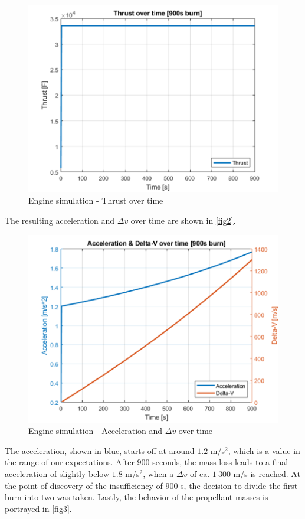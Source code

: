 \begin{figure}[H]
	\centering\includegraphics[width=0.9\linewidth]{thrusttime}
	\caption{Engine simulation - Thrust over time}\label{fig1}
\end{figure}
\clearpage
The resulting acceleration and $\Delta v$ over time are shown in \autoref{fig2}.
\begin{figure}[H]
	\centering\includegraphics[width=0.9\linewidth]{accdeltav}
	\caption{Engine simulation - Acceleration and $\Delta v$ over time}\label{fig2}
\end{figure}

The acceleration, shown in blue, starts off at around $1.2$ m/s$^2$, which is a value in the range of our expectations. After $900$ seconds, the mass loss leads to a final acceleration of slightly below $1.8$ m/s$^2$, when a $\Delta v$ of ca. $1\ 300$ m/s is reached. At the point of discovery of the insufficiency of $900$ s, the decision to divide the first burn into two was taken. 
Lastly, the behavior of the propellant masses is portrayed in \autoref{fig3}. 

